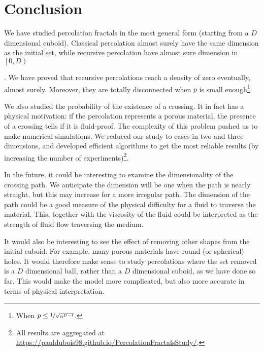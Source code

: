 \section{Conclusion}
We have studied percolation fractals in the most general form (starting from a $D$ dimensional cuboid).
Classical percolation almost surely have the same dimension as the initial set\footnotemark, while recursive percolation have almost sure dimension in $\left[ 0, D \right)$
\addtocounter{footnote}{-1}
\footnotemark
{}.
We have proved that recursive percolations reach a density of zero eventually, almost surely.
Moreover, they are totally disconnected when $p$ is small enough\footnote{When $p \leq \nicefrac{1}{\sqrt{n^{D-1}}}$.}.

We also studied the probability of the existence of a crossing.
It in fact has a physical motivation: if the percolation represents a porous material, the presence of a crossing tells if it is fluid-proof.
The complexity of this problem pushed us to make numerical simulations.
We reduced our study to cases in two and three dimensions, and developed efficient algorithms to get the most reliable results (by increasing the number of experiments)\footnote{All results are aggregated at \url{https://pauldubois98.github.io/PercolationFractalsStudy/}.}.

In the future, it could be interesting to examine the dimensionality of the crossing path.
We anticipate the dimension will be one when the path is nearly straight, but this may increase for a more irregular path.
The dimension of the path could be a good measure of the physical difficulty for a fluid to traverse the material.
This, together with the viscosity of the fluid could be interpreted as the strength of fluid flow traversing the medium.

It would also be interesting to see the effect of removing other shapes from the initial cuboid.
For example, many porous materials have round (or spherical) holes. It would therefore make sense to study percolations where the set removed is a $D$ dimensional ball, rather than a $D$ dimensional cuboid, as we have done so far.
This would make the model more complicated, but also more accurate in terms of physical interpretation.
